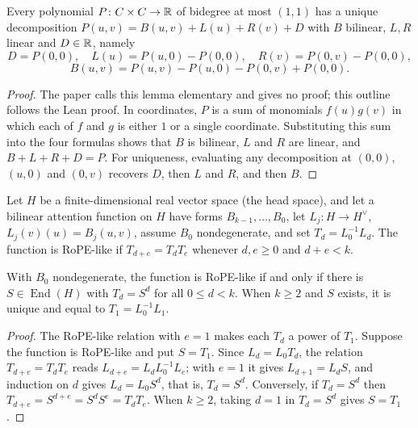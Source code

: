 \begin{lemma}
\label{lem:biaffine-decomposition}
\leanok
Every polynomial $P\colon C\times C\to\mathbb{R}$ of bidegree at most $(1,1)$ has a
unique decomposition $P(u,v)=B(u,v)+L(u)+R(v)+D$ with $B$ bilinear, $L,R$
linear and $D\in\mathbb{R}$, namely
\[
 D=P(0,0),\quad L(u)=P(u,0)-P(0,0),\quad R(v)=P(0,v)-P(0,0),
\]
\[
 B(u,v)=P(u,v)-P(u,0)-P(0,v)+P(0,0).
\]
\end{lemma}
\begin{proof}
\leanok
The paper calls this lemma elementary and gives no proof; this outline
follows the Lean proof. In coordinates, $P$ is
a sum of monomials $f(u)g(v)$ in which each of $f$ and $g$ is either $1$
or a single coordinate. Substituting this sum into the four formulas
shows that $B$ is bilinear, $L$ and $R$ are linear, and $B+L+R+D=P$. For
uniqueness, evaluating any decomposition at $(0,0)$, $(u,0)$ and $(0,v)$
recovers $D$, then $L$ and $R$, and then $B$.
\end{proof}

\begin{definition}
\label{def:rope-like}
\leanok
{}
Let $H$ be a finite-dimensional real vector space (the head space), and let
a bilinear attention function on $H$ have forms
$B_{k-1},\ldots,B_0$, let $L_j\colon H\to H^\vee$, $L_j(v)(u)=B_j(u,v)$,
assume $B_0$ nondegenerate, and set $T_d=L_0^{-1}L_d$. The function is
RoPE-like if $T_{d+e}=T_dT_e$ whenever $d,e\ge0$ and $d+e<k$.
\end{definition}

\begin{proposition}
\label{prop:rope-like}
\leanok
{}
With $B_0$ nondegenerate, the function is RoPE-like if and only if there is
$S\in\operatorname{End}(H)$ with $T_d=S^d$ for all $0\le d<k$. When
$k\ge2$ and $S$ exists, it is unique and equal to $T_1=L_0^{-1}L_1$.
\end{proposition}
\begin{proof}
\leanok
{}
The RoPE-like relation with $e=1$ makes each $T_d$ a power of $T_1$.
Suppose the function is RoPE-like and put $S=T_1$. Since $L_d=L_0T_d$,
the relation $T_{d+e}=T_dT_e$ reads $L_{d+e}=L_dL_0^{-1}L_e$; with $e=1$
it gives $L_{d+1}=L_dS$, and induction on $d$ gives $L_d=L_0S^d$, that
is, $T_d=S^d$. Conversely, if $T_d=S^d$ then
$T_{d+e}=S^{d+e}=S^dS^e=T_dT_e$. When $k\ge2$, taking $d=1$ in $T_d=S^d$
gives $S=T_1$.
\end{proof}

